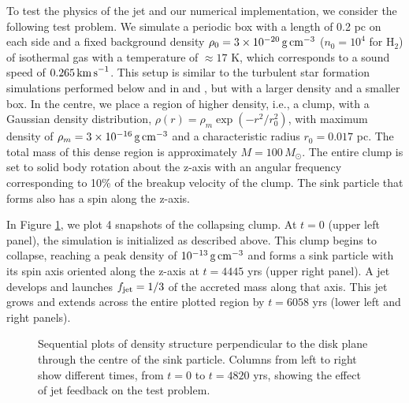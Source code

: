 \documentclass[../dissertation.tex]{subfiles}
\begin{document}
To test the physics of the jet and our numerical implementation, we consider the following test problem.
We simulate a periodic box with a length of 0.2 pc on each side and a fixed background density $\rho_0 = 3\times 10^{-20}\,{\rm g\,cm^{-3}}$ ($n_0 = 10^4$ for H$_2$) of isothermal gas with a temperature of $\approx 17$ K, which corresponds to a sound speed of $0.265\,{\rm km\,s}^{-1}$.
This setup is similar to the turbulent star formation simulations performed below and in \citet{2015ApJ...800...49L} and \citet{2017MNRAS.465.1316M}, but with a larger density and a smaller box.
In the centre, we place a region of higher density, i.e., a clump, with a Gaussian density distribution, $\rho(r) = \rho_m\exp(-r^2/r_0^2)$,  with maximum density of $\rho_m=3\times 10^{-16}\,{\rm g\,cm^{-3}}$ and a characteristic radius $r_0=0.017$ pc.
The total mass of this dense region is approximately $M = 100\,M_{\odot}$.
The entire clump is set to solid body rotation about the z-axis with an angular frequency corresponding to 10\% of the breakup velocity of the clump.
The sink particle that forms also has a spin along the z-axis.

In Figure \ref{fig:jet_test_jet}, we plot 4 snapshots of the collapsing clump.
At $t=0$ (upper left panel), the simulation is initialized as described above.
This clump begins to collapse, reaching a peak density of $10^{-13}\,{\rm g\,cm}^{-3}$ and forms a sink particle with its spin axis oriented along the z-axis at $t= 4445$ yrs (upper right panel).
A jet develops and launches $f_{\rm jet} = 1/3$ of the accreted mass along that axis.
This jet grows and extends across the entire plotted region by $t=6058$ yrs (lower left and right panels).

\begin{figure}[htb] %
  \caption[Jet Test Problem]{Sequential plots of density structure perpendicular to the disk plane through the centre of the sink particle. Columns from left to right show different times, from $t=0$ to $t=4820$ yrs, showing the effect of jet feedback on the test problem.}
    \label{fig:jet_test_jet}
\end{figure}

\end{document}
